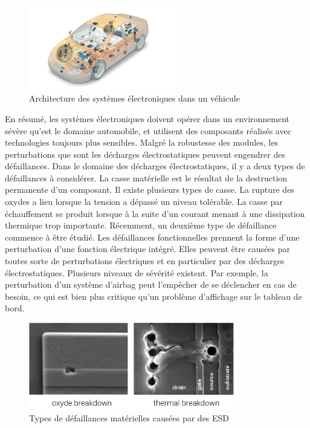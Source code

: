 \begin{figure}[!h]
  \centering
  \includegraphics[width=0.6\textwidth]{src/1/figures/systemintegration_01_uv-data.jpg}
  \caption{Architecture des systèmes électroniques dans un véhicule \cite{car-architecture}}
  \label{fig:car-architecture}
\end{figure}

En résumé, les systèmes électroniques doivent opérer dans un environnement sévère qu'est le domaine automobile, et utilisent des composants réalisés avec technologies toujours plus sensibles.
Malgré la robustesse des modules, les perturbations que sont les décharges électrostatiques peuvent engendrer des défaillances.
Dans le domaine des décharges électrostatiques, il y a deux types de défaillances à considérer.
La casse matérielle est le résultat de la destruction permanente d'un composant.
Il existe plusieurs types de casse.
La rupture des oxydes a lieu lorsque la tension a dépassé un niveau tolérable.
La casse par échauffement se produit lorsque à la suite d'un courant menant à une dissipation thermique trop importante.
Récemment, un deuxième type de défaillance commence à être étudié.
Les défaillances fonctionnelles prennent la forme d'une perturbation d'une fonction électrique intégré.
Elles peuvent être causées par toutes sorte de perturbations électriques et en particulier par des décharges électrostatiques.
Plusieurs niveaux de sévérité existent.
Par exemple, la perturbation d'un système d'airbag peut l'empêcher de se déclencher en cas de besoin, ce qui est bien plus critique qu'un problème d'affichage sur le tableau de bord.

\begin{figure}[!h]
  \centering
  \includegraphics[width=0.8\textwidth]{src/1/figures/esd_failures.pdf}
  \caption{Types de défaillances matérielles causées par des ESD}
  \label{fig:esd-failures}
\end{figure}

